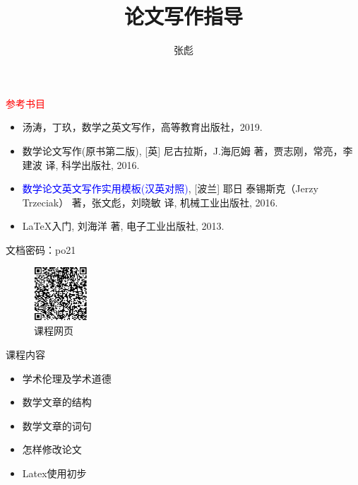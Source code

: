 \documentclass[12pt]{ctexbeamer}
\newcommand{\red}[1]{\textcolor{red}{#1}}
\newcommand{\blue}[1]{\textcolor{blue}{#1}}
\begin{document}
\title[]{论文写作指导 }
\author[]{{\large 张彪} }

\date{}


%



\begin{frame}
\maketitle
\end{frame}



\begin{frame}


\red{参考书目}
	\begin{itemize}
	\item 汤涛，丁玖，数学之英文写作，高等教育出版社，2019. 

	\item  数学论文写作(原书第二版), [英] 尼古拉斯，J.海厄姆 著，贾志刚，常亮，李建波 译, 科学出版社, 2016. 

	\item \blue{数学论文英文写作实用模板(汉英对照)}, [波兰] 耶日 泰锡斯克（Jerzy Trzeciak） 著，张文彪，刘晓敏 译, 机械工业出版社, 2016. 

	\item LaTeX入门, 刘海洋 著, 电子工业出版社, 2013.
	\end{itemize}

	文档密码：po21
	 
\begin{figure}[tb]
	\centering
	\includegraphics[width=0.18\textwidth]{writing.png}
	\caption{课程网页}
\end{figure}

\end{frame}

\begin{frame}{课程内容}
		\begin{itemize}
		\item 学术伦理及学术道德
		
		\item 数学文章的结构
		
		\item 数学文章的词句
		
		\item 怎样修改论文
		
		\item Latex使用初步
		
	\end{itemize}
	
\end{frame}
\end{document}
